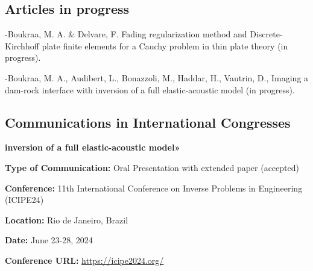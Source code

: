 \documentclass[10pt]{article} %
\begin{document}
\subsection{Articles in progress}
-Boukraa, M. A. \& Delvare, F.  
{Fading regularization method and Discrete-Kirchhoff plate finite elements for a Cauchy problem in thin plate theory} (in progress).

-Boukraa, M. A., Audibert, L., Bonazzoli, M., Haddar, H., Vautrin, D., {Imaging a dam-rock interface with  inversion of a full elastic-acoustic model} (in progress).

\subsection{Communications in International Congresses}
{\vspace{-0.13cm}\textbf{inversion of a full elastic-acoustic model»}
	
	\textbf{Type of Communication:} Oral Presentation with extended paper (accepted)
	
\textbf{Conference:} 11th International Conference on Inverse Problems in Engineering (ICIPE24)
	
	\textbf{Location:} Rio de Janeiro, Brazil 
	
	\textbf{Date:} June 23-28, 2024
	
	\textbf{Conference URL:} \href{https://icipe2024.org/}{https://icipe2024.org/}
}
\end{document}
